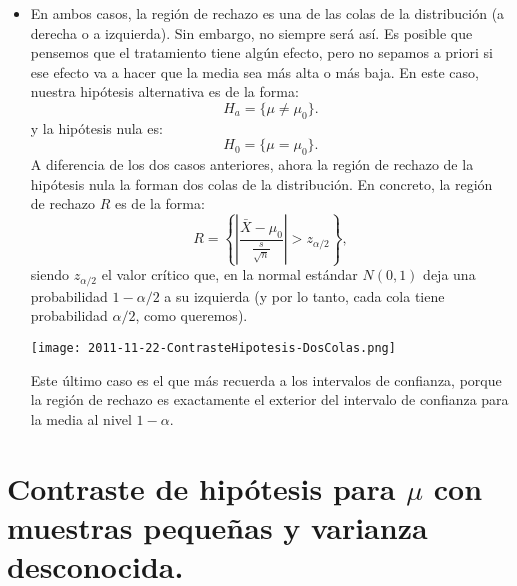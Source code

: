 \begin{itemize}
    \item En ambos casos, la región de rechazo es una de las colas de la distribución (a derecha o a izquierda). Sin embargo, no siempre será así. Es posible que pensemos que el tratamiento tiene algún efecto, pero no sepamos a priori si ese efecto va a hacer que la media sea más alta o más baja. En este caso, nuestra hipótesis alternativa es de la forma:
        \[H_a=\{\mu\neq\mu_0\}.\]
        y la hipótesis nula es:
        \[H_0=\{\mu=\mu_0\}.\]
        A diferencia de los dos casos anteriores, ahora la región de rechazo de la hipótesis nula la forman dos colas de la distribución. En concreto, la región de rechazo $R$ es de la forma:
        \[R=\left\{\left|\dfrac{\bar X-\mu_0}{\frac{s}{\sqrt{n}}}\right|>z_{\alpha/2}\right\},\]
        siendo $z_{\alpha/2}$ el valor crítico que, en la normal estándar  $N(0,1)$ deja una probabilidad $1-\alpha/2$ a su izquierda (y por lo tanto, cada cola tiene probabilidad $\alpha/2$, como queremos).
        \begin{center}
        \texttt{[image: 2011-11-22-ContrasteHipotesis-DosColas.png]}
        \end{center}
        Este último caso es el que más recuerda a los intervalos de confianza, porque la región de rechazo es exactamente el exterior del intervalo de confianza para la media al nivel $1-\alpha$.


    \end{itemize}

       \section{Contraste de hipótesis para $\mu$ con muestras pequeñas y varianza desconocida.}\label{subsec:contrasteHipotesisMediaMuestrasPequennasVarianzaDesconocida}

